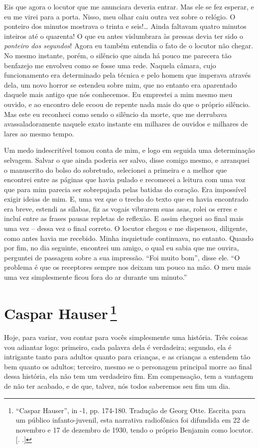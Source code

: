 Eis que agora o locutor que me anunciara deveria entrar. Mas ele se fez
esperar, e eu me virei para a porta. Nisso, meu olhar caiu outra vez
sobre o relógio. O ponteiro dos minutos mostrava o trinta e seis!\ldots{}
Ainda faltavam quatro minutos inteiros até o quarenta! O que eu antes
vislumbrara às pressas devia ter sido o \emph{ponteiro dos segundos}!
Agora eu também entendia o fato de o locutor não chegar. No mesmo
instante, porém, o silêncio que ainda há pouco me parecera tão benfazejo
me envolveu como se fosse uma rede. Naquela câmara, cujo funcionamento
era determinado pela técnica e pelo homem que imperava através dela, um
novo horror se estendeu sobre mim, que no entanto era aparentado daquele
mais antigo que nós conhecemos. Eu emprestei a mim mesmo meu ouvido, e
ao encontro dele ecoou de repente nada mais do que o próprio silêncio.
Mas este eu reconheci como sendo o silêncio da morte, que me derrubava
avassaladoramente naquele exato instante em milhares de ouvidos e
milhares de lares ao mesmo tempo.

Um medo indescritível tomou conta de mim, e logo em seguida uma
determinação selvagem. Salvar o que ainda poderia ser salvo, disse
comigo mesmo, e arranquei o manuscrito do bolso do sobretudo, selecionei
a primeira e a melhor que encontrei entre as páginas que havia pulado e
recomecei a leitura com uma voz que para mim parecia ser sobrepujada
pelas batidas do coração. Era impossível exigir ideias de mim. E, uma
vez que o trecho do texto que eu havia encontrado era breve, estendi as
sílabas, fiz as vogais vibrarem suas asas, rolei os erres e incluí entre
as frases pausas repletas de reflexão. E assim cheguei ao final mais uma
vez -- dessa vez o final correto. O locutor chegou e me dispensou,
diligente, como antes havia me recebido. Minha inquietude continuava, no
entanto. Quando por fim, no dia seguinte, encontrei um amigo, o qual eu
sabia que me ouvira, perguntei de passagem sobre a sua impressão. ``Foi
muito bom'', disse ele. ``O problema é que os receptores sempre nos
deixam um pouco na mão. O meu mais uma vez simplesmente ficou fora do ar
durante um minuto.''

\chapter{Caspar Hauser\,\footnote[*]{``Caspar Hauser'', in  -1,
  pp. 174-180. Tradução de Georg Otte. Escrita para um público
  infanto-juvenil, esta narrativa radiofônica foi difundida em 22 de
  novembro e 17 de dezembro de 1930, tendo o próprio Benjamin como
  locutor. [. .]} }
Hoje, para variar, vou contar para vocês simplesmente uma história. Três
coisas vou adiantar logo: primeiro, cada palavra dela é verdadeira;
segundo, ela é intrigante tanto para adultos quanto para crianças, e as
crianças a entendem tão bem quanto os adultos; terceiro, mesmo se o
personagem principal morre ao final dessa história, ela não tem um
verdadeiro fim. Em compensação, tem a vantagem de não ter acabado, e de
que, talvez, nós todos saberemos seu fim um dia.

